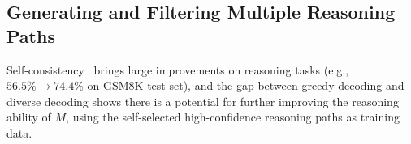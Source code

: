 \documentclass{article} %
\begin{document}
\subsection{Generating and Filtering Multiple Reasoning Paths}%
Self-consistency~\citep{Wang2022SelfConsistencyIC} brings large improvements on reasoning tasks (e.g., $56.5\%\rightarrow74.4\%$ on GSM8K test set), and the gap between greedy decoding and diverse decoding shows there is a potential for further improving the reasoning ability of $M$, using the self-selected high-confidence reasoning paths as training data.
\end{document}
